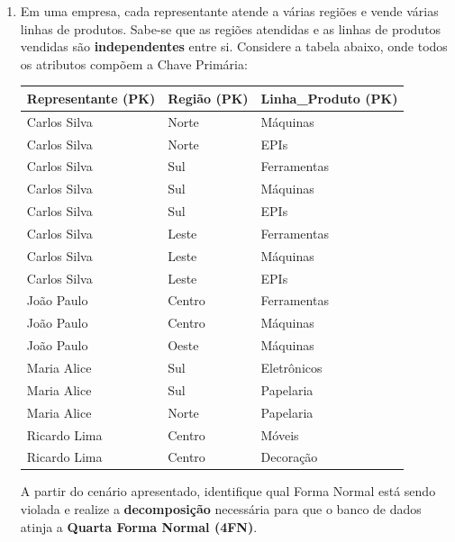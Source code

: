 \documentclass[12pt,a4paper]{article}
\begin{document}
\begin{enumerate}
    \item Em uma empresa, cada representante atende a várias regiões e vende várias linhas de produtos. Sabe-se que as regiões atendidas e as linhas de produtos vendidas são \textbf{independentes} entre si. Considere a tabela abaixo, onde todos os atributos compõem a Chave Primária:

    \begin{center}
        \small
        \begin{tabular}{|l|l|l|}
            \hline
            \cellcolor{gray!20}\textbf{Representante (PK)} & \cellcolor{gray!20}\textbf{Região (PK)} & \cellcolor{gray!20}\textbf{Linha\_Produto (PK)} \\ \hline
            Carlos Silva & Norte & Máquinas \\ \hline
            Carlos Silva & Norte & EPIs \\ \hline
            Carlos Silva & Sul & Ferramentas \\ \hline
            Carlos Silva & Sul & Máquinas \\ \hline
            Carlos Silva & Sul & EPIs \\ \hline
            Carlos Silva & Leste & Ferramentas \\ \hline
            Carlos Silva & Leste & Máquinas \\ \hline
            Carlos Silva & Leste & EPIs \\ \hline
            João Paulo & Centro & Ferramentas \\ \hline
            João Paulo & Centro & Máquinas \\ \hline
            João Paulo & Oeste & Máquinas \\ \hline
            Maria Alice & Sul & Eletrônicos \\ \hline
            Maria Alice & Sul & Papelaria \\ \hline
            Maria Alice & Norte & Papelaria \\ \hline
            Ricardo Lima & Centro & Móveis \\ \hline
            Ricardo Lima & Centro & Decoração \\ \hline
        \end{tabular}
    \end{center}

    A partir do cenário apresentado, identifique qual Forma Normal está sendo violada e realize a \textbf{decomposição} necessária para que o banco de dados atinja a \textbf{Quarta Forma Normal (4FN)}.


\end{enumerate}
\end{document}
